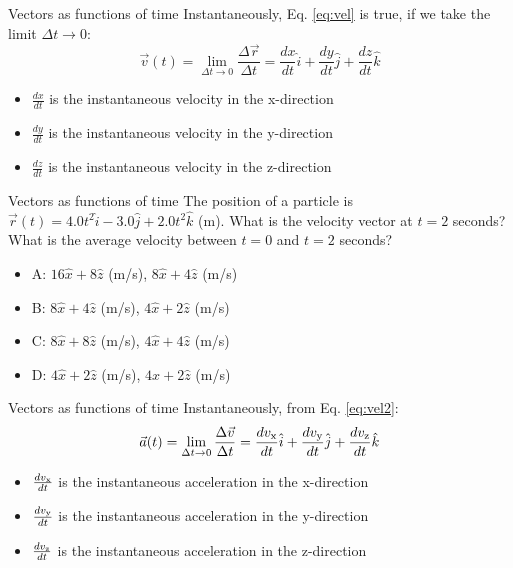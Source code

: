 \documentclass{beamer}
\begin{document}
\begin{frame}{Vectors as functions of time}
Instantaneously, Eq. \ref{eq:vel} is true, if we \alert{take the limit} $\Delta t \to 0$:
\begin{equation}
\vec{v}(t) = \lim_{\Delta t \to 0} \frac{\Delta\vec{r}}{\Delta t} = \frac{dx}{dt}\hat{i} + \frac{dy}{dt}\hat{j} + \frac{dz}{dt}\hat{k}
\label{eq:vel2}
\end{equation}
\begin{itemize}
\item $\frac{dx}{dt}$ is the instantaneous velocity in the x-direction
\item $\frac{dy}{dt}$ is the instantaneous velocity in the y-direction
\item $\frac{dz}{dt}$ is the instantaneous velocity in the z-direction
\end{itemize}
\end{frame}

\begin{frame}{Vectors as functions of time}
The position of a particle is $\vec{r}(t) = 4.0t^2\hat{i} - 3.0 \hat{j} + 2.0t^2\hat{k}$ (m).  What is the velocity vector at $t=2$ seconds?  What is the average velocity between $t=0$ and $t=2$ seconds?
\begin{itemize}
\item A: $16\hat{x} + 8\hat{z}$ (m/s), $8\hat{x} + 4\hat{z}$ (m/s)
\item B: $8\hat{x} + 4\hat{z}$ (m/s), $4\hat{x} + 2\hat{z}$ (m/s)
\item C: $8\hat{x} + 8\hat{z}$ (m/s), $4\hat{x} + 4\hat{z}$ (m/s)
\item D: $4\hat{x} + 2\hat{z}$ (m/s), $4\hat{x} + 2\hat{z}$ (m/s)
\end{itemize}
\end{frame}

\begin{frame}{Vectors as functions of time}
Instantaneously, from Eq. \ref{eq:vel2}: 
\begin{equation}
\vec{a}(t) = \lim_{\Delta t \to 0} \frac{\Delta\vec{v}}{\Delta t} = \frac{dv_{\rm x}}{dt}\hat{i} + \frac{dv_{\rm y}}{dt}\hat{j} + \frac{dv_{\rm z}}{dt}\hat{k}
\label{eq:vel3}
\end{equation}
\begin{itemize}
\item $\frac{dv_{\rm x}}{dt}$ is the instantaneous acceleration in the x-direction
\item $\frac{dv_{\rm y}}{dt}$ is the instantaneous acceleration in the y-direction
\item $\frac{dv_{\rm z}}{dt}$ is the instantaneous acceleration in the z-direction
\end{itemize}
\end{frame}
\end{document}
